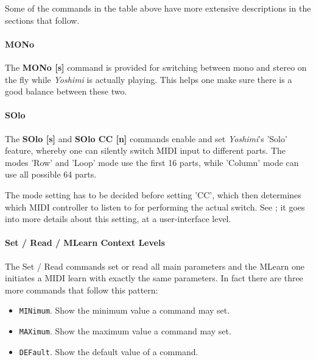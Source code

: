 
   Some of the commands in the table above have more extensive descriptions in
   the sections that follow.

\paragraph{MONo}
\label{paragraph:command_line_mono}
    The \textbf{MONo [s]} command is provided for switching between mono and
    stereo on the fly while \textsl{Yoshimi} is actually playing. This helps
    one make sure there is a good balance between these two.

\paragraph{SOlo}
\label{paragraph:command_line_solo}
   The \textbf{SOlo [s]} and \textbf{SOlo CC [n]}
   commands enable and set \textsl{Yoshimi}'s 'Solo' feature,
   whereby one can silently switch MIDI input to different parts.
   The modes 'Row' and 'Loop' mode use the first 16 parts, while
   'Column' mode can use all possible 64 parts.

   The mode setting has to be decided before setting 'CC', which then determines
   which MIDI controller to listen to for performing the actual switch.
   See ; it goes into more details about
   this setting, at a user-interface level.

\paragraph{Set / Read / MLearn Context Levels}
\label{paragraph:command_line_context_levels}

   The Set / Read commands set or read all main parameters and the MLearn one
   initiates a MIDI learn with exactly the same parameters.
   In fact there are three more commands that follow this pattern:

   \begin{itemize}
   \item \texttt{MINimum}. Show the minimum value a command may set.
   \item \texttt{MAXimum}. Show the maximum value a command may set.
   \item \texttt{DEFault}. Show the default value of a command.
   \end{itemize}

